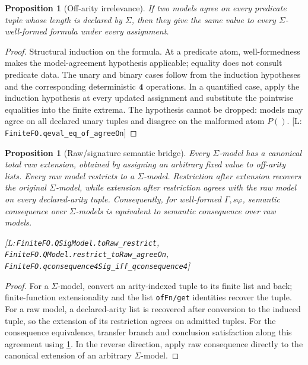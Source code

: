 \documentclass[11pt,a4paper]{article}
\newtheorem{proposition}[theorem]{Proposition}
\theoremstyle{definition}
\newcommand{\FOUR}{\mathbf{4}}
\newcommand{\lean}[1]{\texttt{#1}}
\newenvironment{leanrefs}
  {\par\smallskip\noindent\begin{minipage}{\linewidth}\small\raggedright}
  {\end{minipage}\par\smallskip}
\begin{document}
\begin{proposition}[Off-arity irrelevance]\label{lem:offarity}
If two models agree on every predicate tuple whose length is declared by
$\Sigma$, then they give the same value to every $\Sigma$-well-formed
formula under every assignment.
\end{proposition}

\begin{proof}
Structural induction on the formula. At a predicate atom,
well-formedness makes the model-agreement hypothesis applicable; equality
does not consult predicate data. The unary and binary cases follow from
the induction hypotheses and the corresponding deterministic $\FOUR$
operations. In a quantified case, apply the induction hypothesis at
every updated assignment and substitute the pointwise equalities into
the finite extrema. The hypothesis cannot be dropped: models may agree
on all declared unary tuples and disagree on the malformed atom $P()$.
[L:\,\lean{FiniteFO.qeval\_eq\_of\_agreeOn}]
\end{proof}

\begin{proposition}[Raw/signature semantic bridge]\label{prop:sigbridge}
Every $\Sigma$-model has a canonical total raw extension, obtained by
assigning an arbitrary fixed value to off-arity lists. Every raw model
restricts to a $\Sigma$-model. Restriction after extension recovers the
original $\Sigma$-model, while extension after restriction agrees with the
raw model on every declared-arity tuple. Consequently, for well-formed
$\Gamma,s\varphi$, semantic consequence over $\Sigma$-models is equivalent
to semantic consequence over raw models.
\begin{leanrefs}
[L:\,\lean{FiniteFO.QSigModel.toRaw\_restrict},\\
\quad\lean{FiniteFO.QModel.restrict\_toRaw\_agreeOn},\\
\quad\lean{FiniteFO.qconsequence4Sig\_iff\_qconsequence4}]
\end{leanrefs}
\end{proposition}

\begin{proof}
For a $\Sigma$-model, convert an arity-indexed tuple to its finite list and
back; finite-function extensionality and the list \texttt{ofFn/get}
identities recover the tuple. For a raw model, a declared-arity list is
recovered after conversion to the induced tuple, so the extension of its
restriction agrees on admitted tuples. For the consequence equivalence,
transfer branch and conclusion satisfaction along this agreement using
\cref{lem:offarity}. In the reverse direction, apply raw consequence
directly to the canonical extension of an arbitrary $\Sigma$-model.
\end{proof}
\end{document}
